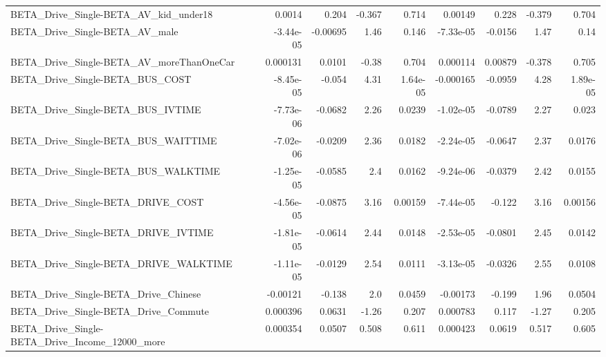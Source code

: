 \begin{tabular}{lrrrrrrrr}
BETA\_Drive\_Single-BETA\_AV\_kid\_under18              &      0.0014 &        0.204 &   -0.367 &    0.714 &    0.00149 &       0.228 &       -0.379 &         0.704 \\
BETA\_Drive\_Single-BETA\_AV\_male                     &   -3.44e-05 &     -0.00695 &     1.46 &    0.146 &  -7.33e-05 &     -0.0156 &         1.47 &          0.14 \\
BETA\_Drive\_Single-BETA\_AV\_moreThanOneCar           &    0.000131 &       0.0101 &    -0.38 &    0.704 &   0.000114 &     0.00879 &       -0.378 &         0.705 \\
BETA\_Drive\_Single-BETA\_BUS\_COST                    &   -8.45e-05 &       -0.054 &     4.31 & 1.64e-05 &  -0.000165 &     -0.0959 &         4.28 &      1.89e-05 \\
BETA\_Drive\_Single-BETA\_BUS\_IVTIME                  &   -7.73e-06 &      -0.0682 &     2.26 &   0.0239 &  -1.02e-05 &     -0.0789 &         2.27 &         0.023 \\
BETA\_Drive\_Single-BETA\_BUS\_WAITTIME                &   -7.02e-06 &      -0.0209 &     2.36 &   0.0182 &  -2.24e-05 &     -0.0647 &         2.37 &        0.0176 \\
BETA\_Drive\_Single-BETA\_BUS\_WALKTIME                &   -1.25e-05 &      -0.0585 &      2.4 &   0.0162 &  -9.24e-06 &     -0.0379 &         2.42 &        0.0155 \\
BETA\_Drive\_Single-BETA\_DRIVE\_COST                  &   -4.56e-05 &      -0.0875 &     3.16 &  0.00159 &  -7.44e-05 &      -0.122 &         3.16 &       0.00156 \\
BETA\_Drive\_Single-BETA\_DRIVE\_IVTIME                &   -1.81e-05 &      -0.0614 &     2.44 &   0.0148 &  -2.53e-05 &     -0.0801 &         2.45 &        0.0142 \\
BETA\_Drive\_Single-BETA\_DRIVE\_WALKTIME              &   -1.11e-05 &      -0.0129 &     2.54 &   0.0111 &  -3.13e-05 &     -0.0326 &         2.55 &        0.0108 \\
BETA\_Drive\_Single-BETA\_Drive\_Chinese               &    -0.00121 &       -0.138 &      2.0 &   0.0459 &   -0.00173 &      -0.199 &         1.96 &        0.0504 \\
BETA\_Drive\_Single-BETA\_Drive\_Commute               &    0.000396 &       0.0631 &    -1.26 &    0.207 &   0.000783 &       0.117 &        -1.27 &         0.205 \\
BETA\_Drive\_Single-BETA\_Drive\_Income\_12000\_more     &    0.000354 &       0.0507 &    0.508 &    0.611 &   0.000423 &      0.0619 &        0.517 &         0.605 \\

\end{tabular}
